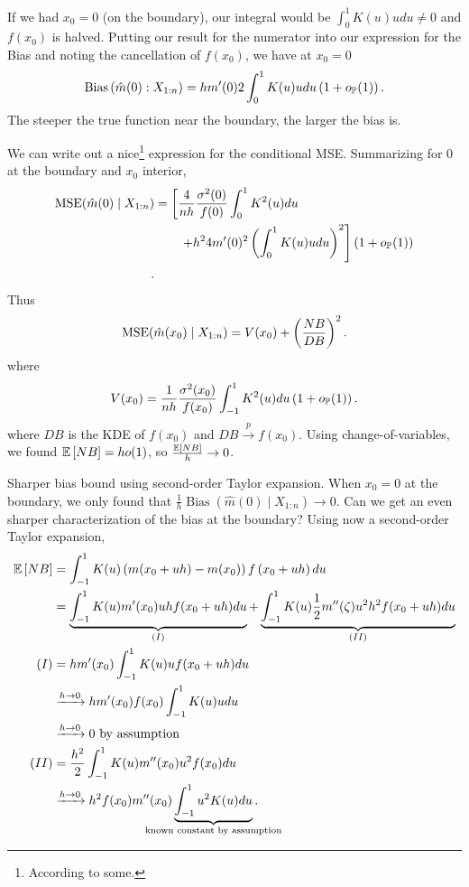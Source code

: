 If we had $x_0 = 0$ (on the boundary), our integral would be $\int_{0}^{1} K(u) u du \ne 0 $ and $f(x_0)$ is halved. Putting our result for the numerator into our expression for the Bias and noting the cancellation of $f(x_0)$, we have at $x_0=0$\[
	\operatorname{Bias}\left(\hat{m}(0) : X_{1:n}\right) = h m'(0) 2 \int_{0}^{1} K(u)udu \left( 1 + o_{\P}(1) \right).\] The steeper the true function near the boundary, the larger the bias is.

We can write out a nice\footnote{According to some.} expression for the conditional MSE. Summarizing for $0$ at the boundary and $x_0$ interior,
\begin{align*}
		\MSE(\hat{m}(0) \mid X_{1:n})
		&= \left[\frac{4}{nh} \frac{\sigma^2(0)}{f(0)} \int_{0}^{1} K^2(u)du \right. \\
		&\qquad \left. + h^2 4 m'(0)^2 \left( \int_{0}^{1} K(u)udu  \right)^2 \right]\left( 1 + o_\P(1) \right) \\
	.\end{align*}
	Thus
	\[
		\MSE(\hat{m}(x_0) \mid X_{1:n}) = V(x_0) + \left(\frac{NB}{DB} \right)^2.
	\]
		where
	\[
		V(x_0) = \frac{1}{nh} \frac{\sigma^2(x_0)}{f(x_0)} \int_{-1}^{1} K^2(u)du \left( 1 + o_{\P}(1) \right).
	\]
where $DB$ is the KDE of $f(x_0)$ and $DB \xrightarrow{p} f(x_0)$.
Using change-of-variables, we found $\E\left[NB\right] = h o(1)$, so $\frac{\E\left[NB\right] }{h} \to 0$.

Sharper bias bound using second-order Taylor expansion.
When $x_0 = 0$ at the boundary, we only found that $\frac{1}{h} \operatorname{Bias}\left(\hat{m}(0) \mid X_{1:n}\right) \to 0$. Can we get an even sharper characterization of the bias at the boundary? Using now a second-order Taylor expansion,
\begin{align*}
	\E\left[NB\right] &= \int_{-1}^{1} K(u) \left( m(x_0 + uh) - m(x_0) \right)f\left( x_0 + uh \right)du  \\
					  &= \underbrace{\int_{-1}^{1} K(u) m'(x_0) uh f(x_0+uh)du}_{(I)} + \underbrace{\int_{-1}^{1} K(u) \frac{1}{2}m''(\zeta) u^2h^2 f(x_0+ uh)du}_{(II)}   \\
					  (I) &= hm'(x_0) \int_{-1}^{1} K(u)u f(x_0 + uh)du  \\
						  &\xrightarrow{h\to 0} hm'(x_0) f(x_0) \int_{-1}^{1} K(u)udu \\ 
						  &\xrightarrow{h\to 0} 0 \text{ by assumption} \\
	(II) &= \frac{h^2}{2} \int_{-1}^{1} K(u) m''(x_0) u^2 f(x_0) du\\
		 &\xrightarrow{h\to 0} h^2f(x_0)m''(x_0) \underbrace{\int_{-1}^{1} u^2 K(u)du}_{\mathclap{\text{known constant by assumption}}}
.\end{align*}

